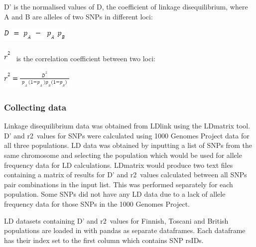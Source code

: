 \documentclass[12pt,a4paper]{article}
\begin{document}
{D' is the normalised values of D, the coefficient of linkage
disequilibrium, where A and B are alleles of two SNPs in different
loci:}

\includegraphics{images/image1.png}{~}

\includegraphics{images/image2.png}{~ }{is the correlation coefficient
between two loci:}

\includegraphics{images/image3.png}

\hypertarget{h.9g8mzey51un2}{%
\subsubsection{\texorpdfstring{{Collecting
data}}{Collecting data}}\label{h.9g8mzey51un2}}

{Linkage disequilibrium data was obtained from LDlink using the LDmatrix
tool. D' and r}{2}{~values for SNPs were calculated using 1000 Genomes
Project data for all three populations. LD data was obtained by
inputting a list of SNPs from the same chromosome and selecting the
population which would be used for allele frequency data for LD
calculations. LDmatrix would produce two text files containing a matrix
of results for D' and r}{2}{~values calculated between all SNPs pair
combinations in the input list. This was performed separately for each
population. Some SNPs did not have any LD data due to a lack of allele
frequency data for those SNPs in the 1000 Genomes Project.}

{LD datasets containing D' and r}{2}{~values for Finnish, Toscani and
British populations are loaded in with pandas as separate dataframes.
Each dataframe has their index set to the first column which contains
SNP rsIDs.}

\protect\hypertarget{t.2d68cf246bdeee4863dcdfbc42860528c30c8e2e}{}{}\protect\hypertarget{t.8}{}{}
\end{document}

